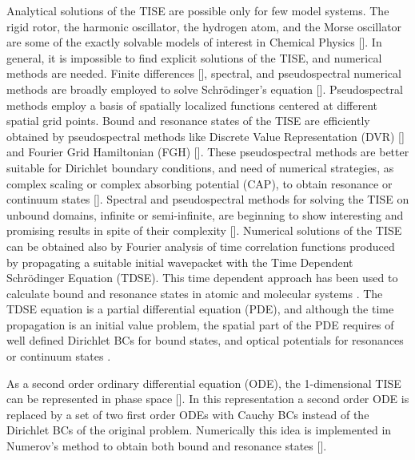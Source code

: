 \documentclass[%
 aip,
 numerical,
 jcp,
 floatfix,
rsi,%
amsmath,amssymb,
reprint,%
author-year%
]{revtex4-1}
\begin{document}
Analytical solutions of the TISE are possible only for few model systems. The rigid rotor, the harmonic oscillator, the hydrogen atom, and the Morse oscillator are some of the exactly solvable models of interest in Chemical Physics []. In general, it is impossible to find explicit solutions of the TISE, and numerical methods are needed. Finite differences [], spectral, and pseudospectral numerical methods are broadly employed to solve Schr\"odinger's equation []. Pseudospectral methods employ a basis of spatially localized functions centered at different spatial grid points.  Bound and resonance states of the TISE are efficiently obtained by pseudospectral methods like Discrete Value Representation (DVR) [] and Fourier Grid Hamiltonian (FGH) []. These pseudospectral methods are better suitable for Dirichlet boundary conditions, and need of numerical strategies, as complex scaling or complex absorbing potential (CAP), to obtain resonance or continuum states []. Spectral and pseudospectral methods for solving the TISE on unbound domains, infinite or semi-infinite, are beginning to show interesting and promising results in spite of their complexity []. Numerical solutions of the TISE can be obtained also by Fourier analysis of time correlation functions produced by propagating a suitable initial wavepacket with the Time Dependent Schr\"odinger Equation (TDSE). This time dependent approach has been used to calculate bound and resonance states in atomic and molecular systems \cite{Blinder1964,Kosloff1994}. The TDSE equation is a partial differential equation (PDE), and although the time propagation is an initial value problem, the spatial part of the PDE requires of well defined Dirichlet BCs for bound states, and optical potentials for resonances or continuum states \cite{Montano2000,Zambrano2002}.

As a second order ordinary differential equation (ODE), the 1-dimensional TISE can be represented in phase space [].  In this representation a second order ODE is replaced by a set of two first order ODEs with Cauchy BCs instead of the Dirichlet BCs of the original problem. Numerically this idea is implemented in Numerov's method to obtain both bound and resonance states []. 
\end{document}
